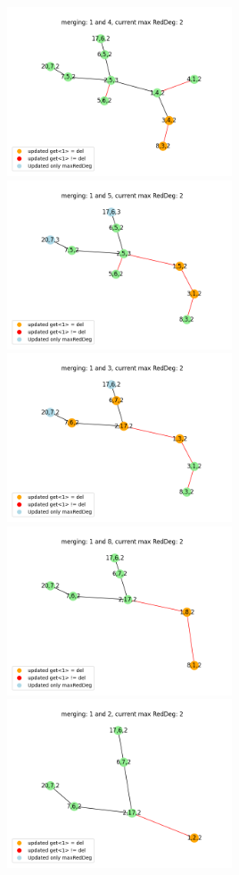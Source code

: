 \documentclass[10pt]{article}
\begin{document}
\includegraphics[width=0.5\textwidth]{images/merge15.png}
\includegraphics[width=0.5\textwidth]{images/merge16.png}
\includegraphics[width=0.5\textwidth]{images/merge17.png}
\includegraphics[width=0.5\textwidth]{images/merge18.png}
\includegraphics[width=0.5\textwidth]{images/merge19.png}
\end{document}
